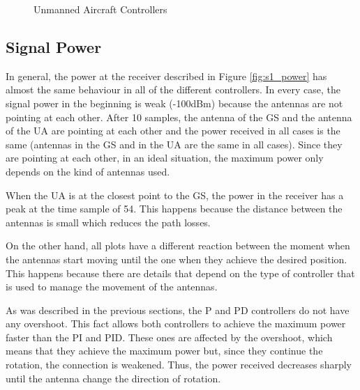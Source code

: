 \begin{figure}[H]
	\hfill
	\caption{Unmanned Aircraft Controllers}
	\label{fig:s1_ua}
\end{figure}

\subsection*{Signal Power}
In general, the power at the receiver described in Figure \ref{fig:s1_power} has almost the same behaviour in all of the different controllers. In every case, the signal power in the beginning is weak (-100dBm) because the antennas are not pointing at each other. After 10 samples, the antenna of the GS and the antenna of the UA are pointing at each other and the power received in all cases is the same (antennas in the GS and in the UA are the same in all cases). Since they are pointing at each other, in an ideal situation, the maximum power only depends on the kind of antennas used.

When the UA is at the closest point to the GS, the power in the receiver has a peak at the time sample of 54. This happens because the distance between the antennas is small which reduces the path losses.

On the other hand, all plots have a different reaction between the moment when the antennas start moving until the one when they achieve the desired position. This happens because there are details that depend on the type of controller that is used to manage the movement of the antennas. 

As was described in the previous sections, the P and PD controllers do not have any overshoot. This fact allows both controllers to achieve the maximum power faster than the PI and PID. These ones are affected by the overshoot, which means that they achieve the maximum power but, since they continue the rotation, the connection is weakened. Thus, the power received decreases sharply until the antenna change the direction of rotation.


